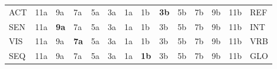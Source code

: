 \begin{tabularx}{\textwidth}{l C C C C C C C C C C C C l}
    ACT & 11a & 9a & 7a & 5a & 3a & 1a & 1b & \colorbox{BurntOrange}{\textbf{3b}} & 5b & 7b & 9b & 11b & REF \\
    SEN & 11a & \colorbox{BurntOrange}{\textbf{9a}} & 7a & 5a & 3a & 1a & 1b & 3b & 5b & 7b & 9b & 11b & INT \\
    VIS & 11a & 9a & \colorbox{BurntOrange}{\textbf{7a}} & 5a & 3a & 1a & 1b & 3b & 5b & 7b & 9b & 11b & VRB \\
    SEQ & 11a & 9a & 7a & 5a & 3a & 1a & \colorbox{BurntOrange}{\textbf{1b}} & 3b & 5b & 7b & 9b & 11b & GLO \\
\end{tabularx}